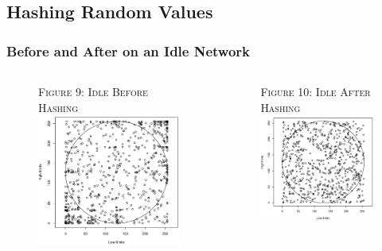 \documentclass{beamer}
\begin{document}
\subsection{Hashing Random Values}
\begin{frame}
\frametitle{Before and After on an Idle Network}
\begin{columns}
\begin{column}{0.5\textwidth}
\begin{figure}
{\tiny \textsc{Figure 9: Idle Before Hashing}}\\
\includegraphics[scale = 0.43]{images/ibh.png}
\end{figure}
\end{column}
\begin{column}{0.5\textwidth}
\begin{figure}
{\tiny \textsc{Figure 10: Idle After Hashing}}\\
\includegraphics[scale = 0.5]{images/iah.png}
\end{figure}
\end{column}
\end{columns}
\end{frame}
\end{document}
